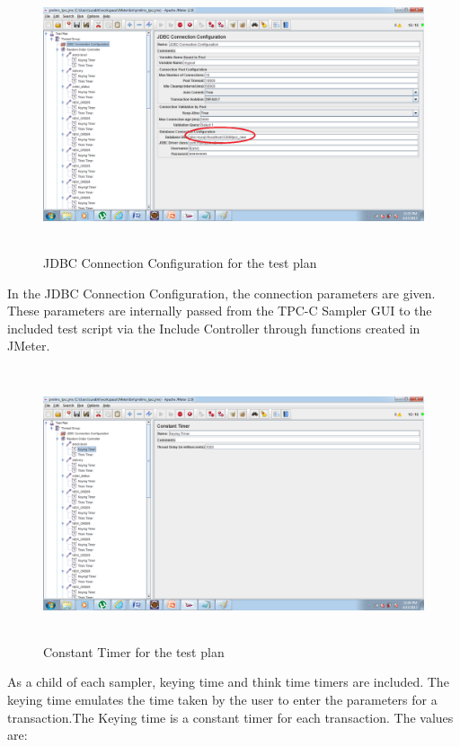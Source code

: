 \documentclass[12pt]{book}
\begin{document}
  \begin{figure}[H]
    \centering
    \includegraphics[width=15cm, height=8cm]{images/ntpcc_87}
    \caption{JDBC Connection Configuration for the test plan\label{fig:fig71_JMeter}}
  \end{figure} 
  
  In the JDBC Connection Configuration, the connection parameters are given. These parameters are internally passed from the TPC-C Sampler GUI to the 
  included test script via the Include Controller through functions created in JMeter.\\
  
  \begin{figure}[H]
    \centering
    \includegraphics[width=15cm, height=8cm]{images/ntpcc_88}
    \caption{Constant Timer for the test plan\label{fig:fig72_JMeter}}
  \end{figure} 

    As a child of each sampler, keying time and think time timers are included.
  The keying time emulates the time taken by the user to enter the parameters for a transaction.The Keying time is a constant timer for each transaction.
    The values are:
   
\end{document}

